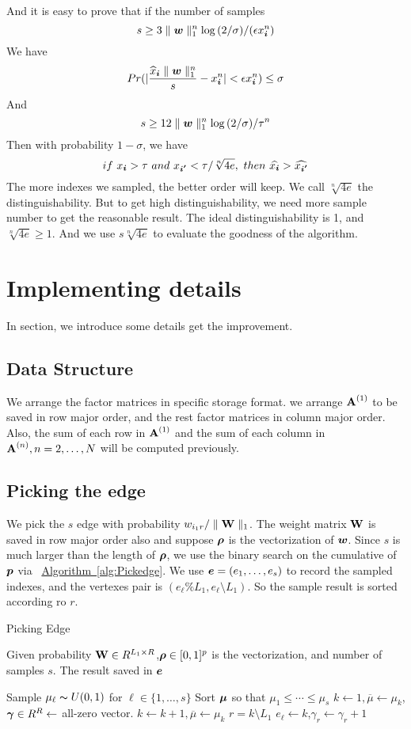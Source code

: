 \documentclass{article}
\newcommand{\V}[1]{{\bm{{\MakeLowercase{#1}}}}}
\newcommand{\M}[1]{{\bm{\mathbf{\MakeUppercase{#1}}}}}
\newcommand{\Mn}[2]{\M{#1}^{(#2)}}
\newcommand{\norm}[2]{\parallel#1\parallel_{#2}}
\newcommand{\Alg}[1] {\hyperref[alg:#1] {Algorithm~\ref*{alg:#1}}}
\begin{document}
And it is easy to prove that if the number of samples
\[
s \geq 3\norm{\V{w}}{1}^n\log{(2/\sigma)}/(\epsilon x^n_{\V{i}})
\]
We have
\[
Pr(|\frac{\widehat{x}_\V{i}\norm{\V{w}}{1}^n}{s} - x^n_{\V{i}}| < \epsilon x^n_{\V{i}}) \leq \sigma
\]
And
\[
    s \geq 12\norm{\V{w}}{1}^n\log{(2/\sigma)}/\tau^n
\]
Then with probability $1-\sigma$, we have
\[
if\ x_{\V{i}} > \tau\ and \ x_{\V{i'}} < \tau/\sqrt[n]{4e}, \ then\ \widehat{x_{\V{i}}} > \widehat{x_{\V{i'}}}
\]
The more indexes we sampled, the better order will keep. We call $\sqrt[n]{4e}$ the distinguishability. But to get high distinguishability, we need more sample number to get the reasonable result. The ideal distinguishability is 1, and  $\sqrt[n]{4e} \geq 1$. And we use $s\sqrt[n]{4e}$ to evaluate the goodness of the algorithm.
\section{Implementing details}
In section, we introduce some details get the improvement.
\subsection{Data Structure}
We arrange the factor matrices in specific storage format. we arrange $\Mn{A}{1}$ to be saved in row major order, and the rest factor matrices in column major order. Also, the sum of each row in $\Mn{A}{1}$ and the sum of each column in $\Mn{A}{n},n=2,\ldots,N$ will be computed previously.

\subsection{Picking the edge}
We pick the $s$ edge with probability  $w_{i_1r}/\norm{\M{W}}{1}$. The weight matrix $\M{W}$ is saved in row major order also and suppose $\V{\rho}$ is the vectorization of $\V{W}$. Since $s$ is much larger than the length of $\V{\rho}$, we use the binary search on the cumulative of $\V{p}$ via ~\Alg{Pickedge}. We use $\V{e}=(e_1,\ldots,e_s)$ to record the sampled indexes, and the vertexes pair is $(e_{\ell}\%L_1,e_{\ell}\setminus L_1)$. So the sample result is sorted according ro $r$.

\begin{algorithm}[ht]
    \caption{Picking Edge}
    \label{alg:Pickedge}
    Given probability $\M{W}\in R^{L_1\times R}$,$\V{\rho}\in[0,1]^p$ is the vectorization, and number of samples $s$.
    The result saved in $\V{e}$
    \begin{algorithmic}[1]
    \State Sample $\mu_{\ell} \thicksim U(0,1)$ for $\ell \in \{1,\ldots,s\}$
    \State Sort $\V{\mu}$ so that $\mu_1 \leq \cdots\leq\mu_s$
    \State $k \leftarrow 1,\overline{\mu} \leftarrow \mu_k$,$\V{\gamma}\in R^R\leftarrow$ all-zero vector.
    \While {$\mu_{\ell} > \overline{\mu}$}
    \State $k \leftarrow k+1,\overline{\mu} \leftarrow \mu_k$
    \EndWhile
    \State $r = k \setminus L_1$
    \State $e_{\ell}\leftarrow k$,$\gamma_{r}\leftarrow \gamma_{r} + 1$
    \EndFor
    \end{algorithmic}
\end{algorithm}
\end{document}
